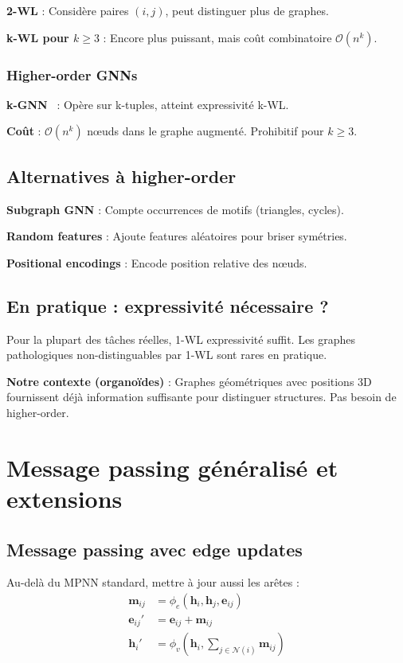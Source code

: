 \textbf{2-WL} : Considère paires $(i, j)$, peut distinguer plus de graphes.

\textbf{k-WL pour $k \geq 3$} : Encore plus puissant, mais coût combinatoire $\mathcal{O}(n^k)$.

\subsubsection{Higher-order GNNs}

\textbf{k-GNN}~\cite{Morris2019} : Opère sur k-tuples, atteint expressivité k-WL.

\textbf{Coût} : $\mathcal{O}(n^k)$ nœuds dans le graphe augmenté. Prohibitif pour $k \geq 3$.

\subsection{Alternatives à higher-order}

\textbf{Subgraph GNN} : Compte occurrences de motifs (triangles, cycles).

\textbf{Random features} : Ajoute features aléatoires pour briser symétries.

\textbf{Positional encodings} : Encode position relative des nœuds.

\subsection{En pratique : expressivité nécessaire ?}

Pour la plupart des tâches réelles, 1-WL expressivité suffit. Les graphes pathologiques non-distinguables par 1-WL sont rares en pratique.

\textbf{Notre contexte (organoïdes)} : Graphes géométriques avec positions 3D fournissent déjà information suffisante pour distinguer structures. Pas besoin de higher-order.

\section{Message passing généralisé et extensions}

\subsection{Message passing avec edge updates}

Au-delà du MPNN standard, mettre à jour aussi les arêtes :
\begin{align*}
\mathbf{m}_{ij} &= \phi_e\left(\mathbf{h}_i, \mathbf{h}_j, \mathbf{e}_{ij}\right) \\
\mathbf{e}_{ij}' &= \mathbf{e}_{ij} + \mathbf{m}_{ij} \\
\mathbf{h}_i' &= \phi_v\left(\mathbf{h}_i, \sum_{j \in \mathcal{N}(i)} \mathbf{m}_{ij}\right)
\end{align*}

